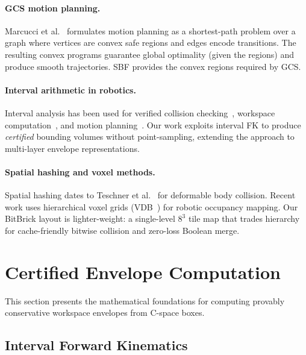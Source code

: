 \documentclass[journal]{IEEEtran}
\begin{document}
\paragraph{GCS motion planning.}
Marcucci et al.~\cite{marcucci2024motion} formulates motion
planning as a shortest-path problem over a graph where
vertices are convex safe regions and edges encode transitions.
The resulting convex programs guarantee global optimality
(given the regions) and produce smooth trajectories.
SBF provides the convex regions required by GCS.

\paragraph{Interval arithmetic in robotics.}
Interval analysis has been used for verified collision
checking~\cite{merlet2004solving}, workspace
computation~\cite{merlet2006interval}, and motion
planning~\cite{jaulin2001applied}.
Our work exploits interval FK to produce \emph{certified}
bounding volumes without point-sampling, extending the
approach to multi-layer envelope representations.

\paragraph{Spatial hashing and voxel methods.}
Spatial hashing dates to Teschner et al.~\cite{teschner2003optimized}
for deformable body collision.
Recent work uses hierarchical voxel grids (VDB~\cite{museth2013vdb})
for robotic occupancy mapping.
Our BitBrick layout is lighter-weight: a single-level
$8^3$ tile map that trades hierarchy for cache-friendly
bitwise collision and zero-loss Boolean merge.

\section{Certified Envelope Computation}\label{sec:envelope}


This section presents the mathematical foundations for computing
provably conservative workspace envelopes from C-space boxes.

\subsection{Interval Forward Kinematics}\label{sec:ifk}
\end{document}
